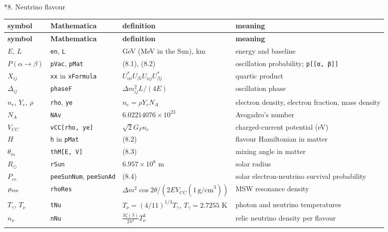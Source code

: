 \documentclass[10pt,a4paper]{article}
\makeatletter
\renewcommand\section{\@startsection{section}{1}{\z@}{-3.5ex \@plus -1ex \@minus -.2ex}{2.3ex \@plus.2ex}{\normalfont\Large\bfseries\raggedright}}
\makeatother
\begin{document}
\section*{8. Neutrino flavour}
{\small
\begin{longtable}{>{\raggedright\arraybackslash}p{}>{\raggedright\arraybackslash}p{}>{\raggedright\arraybackslash}p{}>{\raggedright\arraybackslash}p{}}
\toprule
\textbf{symbol} & \textbf{Mathematica} & \textbf{definition} & \textbf{meaning} \\
\midrule\endfirsthead
\toprule
\textbf{symbol} & \textbf{Mathematica} & \textbf{definition} & \textbf{meaning} \\
\midrule\endhead
\endfoot
\bottomrule\endlastfoot
$E$, $L$ & \texttt{en}, \texttt{L} & GeV (MeV in the Sun), km & energy and baseline \\
$P(\alpha\to\beta)$ & \texttt{pVac}, \texttt{pMat} & (8.1), (8.2) & oscillation probability; \texttt{p[[α, β]]} \\
$X_{ij}$ & \texttt{xx} in \texttt{xFormula} & $U^*_{\alpha i}U_{\beta i}U_{\alpha j}U^*_{\beta j}$ & quartic product \\
$\Delta_{ij}$ & \texttt{phaseF} & $\Delta m^2_{ij}L/(4E)$ & oscillation phase \\
$n_e$, $Y_e$, $\rho$ & \texttt{rho}, \texttt{ye} & $n_e=\rho Y_eN_A$ & electron density, electron fraction, mass density \\
$N_A$ & \texttt{NAv} & $6.02214076\times10^{23}$ & Avogadro’s number \\
$V_{CC}$ & \texttt{vCC[rho, ye]} & $\sqrt2G_Fn_e$ & charged-current potential (eV) \\
$H$ & \texttt{h} in \texttt{pMat} & (8.2) & flavour Hamiltonian in matter \\
$\theta_m$ & \texttt{thM[E, V]} & (8.3) & mixing angle in matter \\
$R_\odot$ & \texttt{rSun} & $6.957\times10^8$ m & solar radius \\
$P_{ee}$ & \texttt{peeSunNum}, \texttt{peeSunAd} & (8.4) & solar electron-neutrino survival probability \\
$\rho_{\rm res}$ & \texttt{rhoRes} & $\Delta m^2\cos2\theta/(2EV_{CC}(1\,\text{g/cm}^3))$ & MSW resonance density \\
$T_\gamma$, $T_\nu$ & \texttt{tNu} & $T_\nu=(4/11)^{1/3}T_\gamma$, $T_\gamma=2.7255$ K & photon and neutrino temperatures \\
$n_\nu$ & \texttt{nNu} & $\frac{3\zeta(3)}{2\pi^2}T_\nu^3$ & relic neutrino density per flavour \\*
\end{longtable}}
\end{document}

